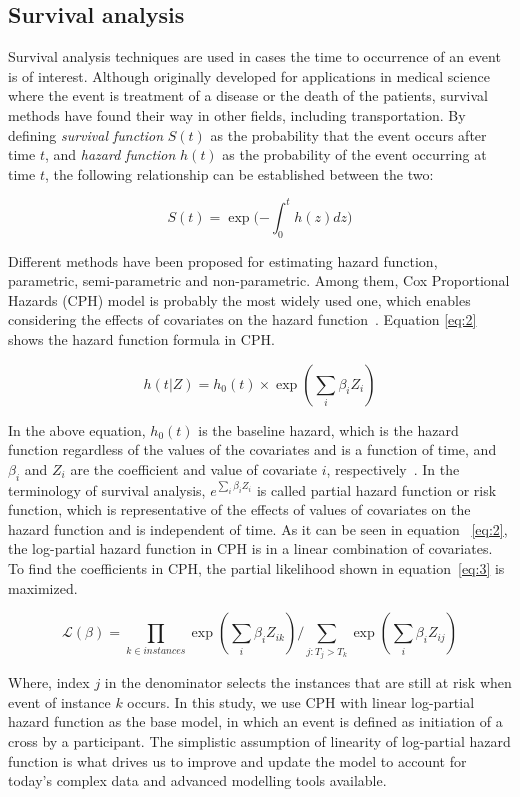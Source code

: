 \subsection{Survival analysis}
Survival analysis techniques are used in cases the time to occurrence of an event is of interest. Although originally developed for applications in medical science where the event is treatment of a disease or the death of the patients, survival methods have found their way in other fields, including transportation. By defining \textit{survival function} $S(t)$ as the probability that the event occurs after time $t$, and \textit{hazard function} $h(t)$ as the probability of the event occurring at time $t$, the following relationship can be established between the two:
\begin{linenomath}
\begin{equation}
\label{eq:1}
    S(t)=\exp({-\displaystyle \int_{0}^{t} h(z) dz)}
\end{equation}
\end{linenomath}
Different methods have been proposed for estimating hazard function, parametric, semi-parametric and non-parametric. Among them, Cox Proportional Hazards (CPH) model is probably the most widely used one, which enables considering the effects of covariates on the hazard function~\citep{cox1972regression}. Equation \ref{eq:2} shows the hazard function formula in CPH.
\begin{linenomath}
\begin{equation}
\label{eq:2}
    h(t|Z)=h_0(t) \times \exp({\displaystyle \sum_{i} \beta_i Z_i})
\end{equation}
\end{linenomath}
In the above equation, $h_0(t)$ is the baseline hazard, which is the hazard function regardless of the values of the covariates and is a function of time, and $\beta_i$ and $Z_i$ are the coefficient and value of covariate $i$, respectively~\citep{therneau2013modeling}. In the terminology of survival analysis, ${e^{\textstyle \sum_{i} \beta_i Z_i}}$ is called partial hazard function or risk function, which is representative of the effects of values of covariates on the hazard function and is independent of time. As it can be seen in equation ~\ref{eq:2}, the log-partial hazard function in CPH is in a linear combination of covariates. To find the coefficients in CPH, the partial likelihood shown in equation~\ref{eq:3} is maximized.
\begin{linenomath}
\begin{equation}
\label{eq:3}
\mathcal{L}(\beta) = \prod_{k\in instances}{\exp({\displaystyle \sum_{i} \beta_i Z_{ik}})} / {\displaystyle \sum_{j: T_j > T_k} \exp({\displaystyle  \sum_{i} \beta_i Z_{ij}})}
\end{equation}
\end{linenomath}
Where, index $j$ in the denominator selects the instances that are still at risk when event of instance $k$ occurs. In this study, we use CPH with linear log-partial hazard function as the base model, in which an event is defined as initiation of a cross by a participant. The simplistic assumption of linearity of log-partial hazard function is what drives us to improve and update the model to account for today's complex data and advanced modelling tools available.  
